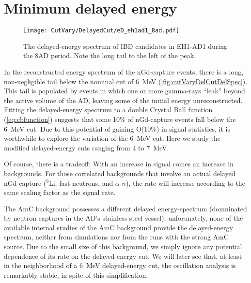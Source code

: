 \documentclass[../thesis.tex]{subfiles}
\begin{document}
\section{Minimum delayed energy}
\label{sec:cutVaryMinDelayed}

\begin{figure}[ht]
  \texttt{[image: CutVary/DelayedCut/eD\_eh1ad1\_8ad.pdf]}
  \caption{The delayed-energy spectrum of IBD candidates in EH1-AD1 during the 8AD period. Note the long tail to the left of the peak.}
  \label{fig:cutVaryDelCutDelSpec}
\end{figure}

In the reconstructed energy spectrum of the nGd-capture events, there is a long, non-negligible tail below the nominal cut of 6~MeV (\autoref{fig:cutVaryDelCutDelSpec}). This tail is populated by events in which one or more gamma-rays ``leak'' beyond the active volume of the AD, leaving some of the initial energy unreconstructed. Fitting the delayed-energy spectrum to a double Crystal Ball function (\autoref{eq:cbfunction}) suggests that some 10\% of nGd-capture events fall below the 6~MeV cut. Due to this potential of gaining O(10\%) in signal statistics, it is worthwhile to explore the variation of the 6~MeV cut. Here we study the modified delayed-energy cuts ranging from 4 to 7~MeV.

Of course, there is a tradeoff: With an increase in signal comes an increase in backgrounds. For those correlated backgrounds that involve an actual delayed nGd capture ($^9$Li, fast neutrons, and $\alpha$-$n$), the rate will increase according to the same scaling factor as the signal rate.

The AmC background possesses a different delayed energy-spectrum (domninated by neutron captures in the AD's stainless steel vessel); unforunately, none of the available internal studies of the AmC background provide the delayed-energy spectrum, neither from simulations nor from the runs with the strong AmC source. Due to the small size of this background, we simply ignore any potential dependence of its rate on the delayed-energy cut. We will later see that, at least in the neighborhood of a 6~MeV delayed-energy cut, the oscillation analysis is remarkably stable, in spite of this simplification.
\end{document}
